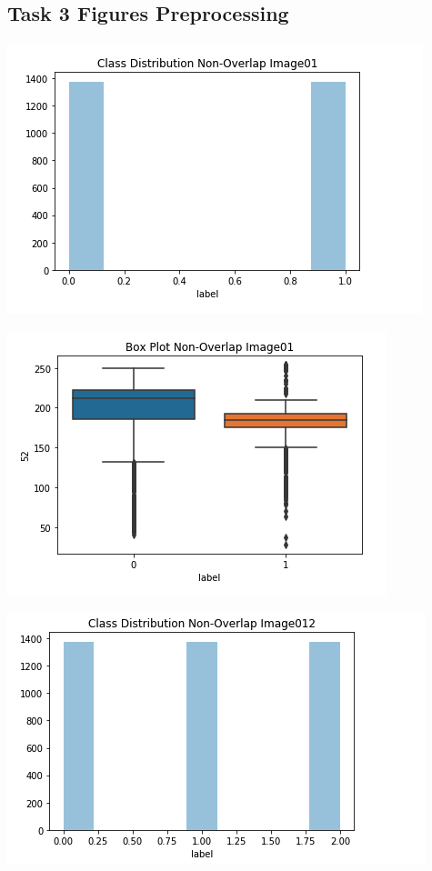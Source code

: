 \documentclass[12pt]{article}
\begin{document}
\begin{multicols*}{2}
  \subsection{Task 3 Figures Preprocessing}
  \begin{center}
	\includegraphics[scale=0.4]{../screenshot/Pre-Non-Overlapping/dist01.png}

	\includegraphics[scale=0.4]{../screenshot/Pre-Non-Overlapping/box01.png}

	\includegraphics[scale=0.4]{../screenshot/Pre-Non-Overlapping/dis012.png}


\end{center}
\end{multicols*}
\end{document}
